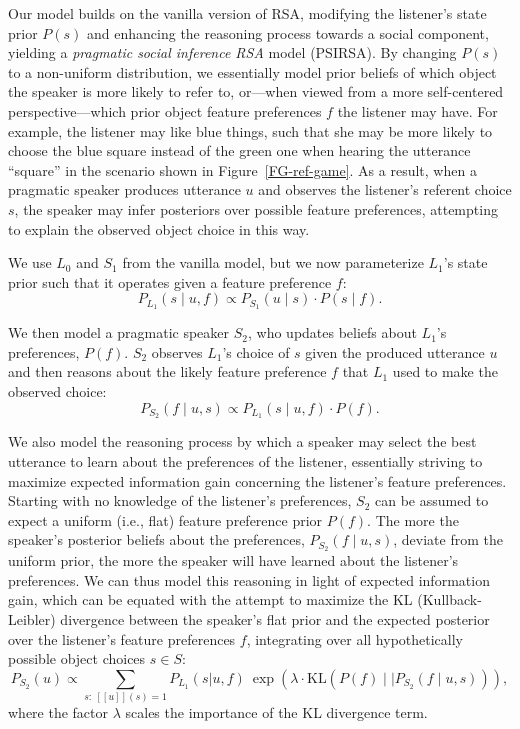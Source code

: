 \documentclass[11pt,a4paper]{article}
\newcommand{\gcs}[1]{\textcolor{blue}{[gcs: #1]}}
\begin{document}
Our model builds on the vanilla version of RSA, modifying the listener's state prior $P(s)$ and enhancing the reasoning process towards a social component, yielding a \emph{pragmatic social inference RSA} model (PSIRSA). %
By changing $P(s)$ to a non-uniform distribution, we essentially model prior beliefs of which object the speaker is more likely to refer to, or---when viewed from a more self-centered perspective---which prior object feature preferences $f$ the listener may have. 
For example, the listener may like blue things, such that she may be more likely to choose the blue square instead of the green one when hearing the utterance ``square'' in the scenario shown in Figure~\ref{FG-ref-game}.
As a result, when a pragmatic speaker produces utterance $u$ and observes the listener's referent choice $s$, the speaker may infer posteriors over possible feature preferences, attempting to explain the observed object choice in this way.

We use $L_0$ and $S_1$ from the vanilla model, but we now parameterize $L_1$'s state prior such that it operates given a feature preference $f$:
\begin{equation}
P_{L_{1}}(s\mid u,f) \propto P_{S_{1}}(u \mid s) \cdot P(s \mid f).
\end{equation}

We then model a pragmatic speaker $S_2$, who updates beliefs about $L_1$'s preferences, $P(f)$.
$S_2$ observes $L_1$'s choice of $s$ given the produced utterance $u$ and then reasons about the likely feature preference $f$ that $L_1$ used to make the observed choice:
\begin{equation}
P_{S_{2}}(f\mid u,s) \propto P_{L_{1}}(s \mid u,f) \cdot P(f).
\end{equation}


We also model the reasoning process by which a speaker may select the best utterance to learn about the preferences of the listener, essentially striving to maximize expected information gain concerning the listener's feature preferences.
Starting with no knowledge of the listener's preferences, $S_2$ can be assumed to expect a uniform (i.e., flat) feature preference prior $P(f)$.
The more the speaker's posterior beliefs about the preferences, $P_{S_{2}}(f\mid u,s)$, deviate from the uniform prior, the more the speaker will have learned about the listener's preferences. 
We can thus model this reasoning in light of expected information gain, which can be equated with the attempt to maximize the KL (Kullback-Leibler) divergence between the speaker's flat prior and the expected posterior over the listener's feature preferences $f$, integrating over all hypothetically possible object choices $s \in S$: %
\begin{equation}
P_{S_2}(u) \propto \sum_{s:\  [\![u]\!](s)=1} P_{L_1}(s|u,f)\ \exp(\lambda \cdot \textrm{KL}(P(f)\mid\mid P_{S_{2}}(f\mid u,s))),
\label{eq:kldivlambda}
\end{equation}
where the factor $\lambda$ scales the importance of the KL divergence term. 
\end{document}
